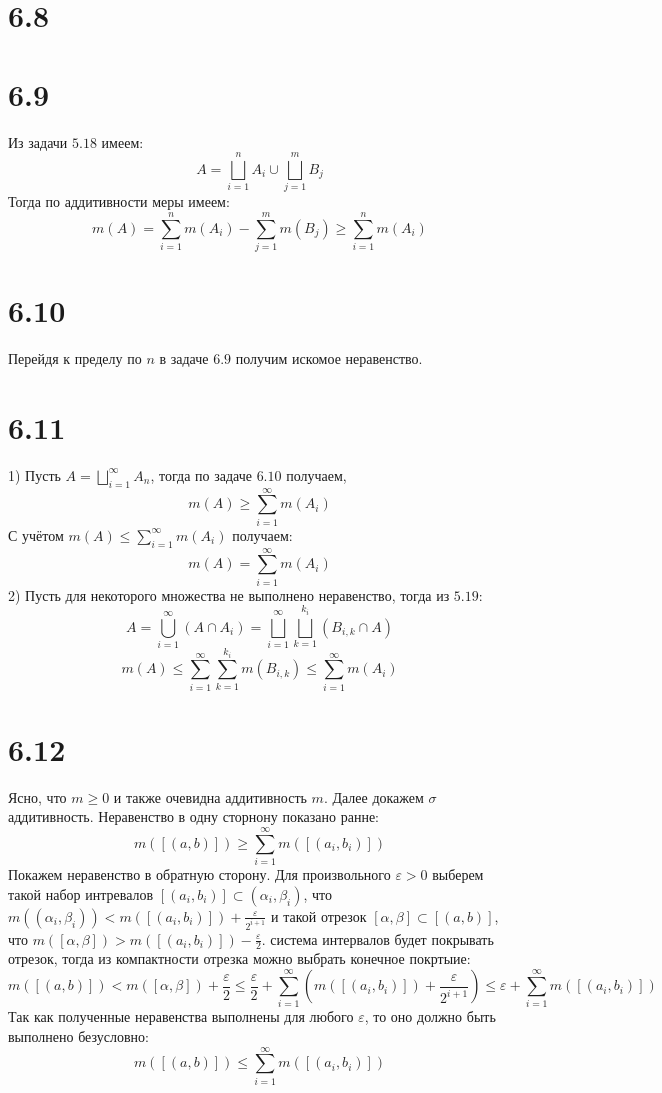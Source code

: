 \documentclass[12pt]{article}
\begin{document}
\section{6.8}
\section{6.9}
Из задачи $5.18$ имеем:
\[
    A = \bigsqcup_{i=1}^{n} A_i \cup \bigsqcup_{j=1}^{m} B_j
\]
Тогда по аддитивности меры имеем:
\[
    m(A) = \sum_{i=1}^{n} m(A_i) - \sum_{j=1}^{m} m(B_j) \geq \sum_{i=1}^{n} m(A_i)
\]
\section{6.10}
Перейдя к пределу по $n$ в задаче $6.9$ получим искомое неравенство.
\section{6.11}
1) Пусть $A = \bigsqcup_{i=1}^{\infty} A_n$, тогда по задаче $6.10$ получаем,
\[
    m(A) \geq \sum_{i=1}^{\infty} m(A_i)
\]
С учётом $m(A) \leq \sum_{i=1}^{\infty} m(A_i)$ получаем:
\[
    m(A) = \sum_{i=1}^{\infty} m(A_i)
\]
2) Пусть для некоторого множества не выполнено неравенство, тогда из $5.19$:
\[
    A = \bigcup_{i=1}^{\infty} (A \cap A_i) = \bigsqcup_{i=1}^{\infty} \bigsqcup_{k=1}^{k_i} (B_{i, k} \cap A)
\]
\[
    m(A) \leq \sum_{i=1}^{\infty} \sum_{k=1}^{k_i} m(B_{i, k}) \leq \sum_{i=1}^{\infty} m(A_i)
\]
\section{6.12}
Ясно, что $m \geq 0$ и также очевидна аддитивность $m$. Далее докажем $\sigma$ аддитивность. 
Неравенство в одну сторнону показано ранне: 
\[
    m([(a, b)]) \geq \sum_{i=1}^{\infty} m([(a_i, b_i)])
\]
Покажем неравенство в обратную сторону. Для произвольного $\varepsilon > 0$ 
выберем такой набор интревалов $[(a_i, b_i)] \subset (\alpha_i, \beta_i)$, что 
$m((\alpha_i, \beta_i)) < m([(a_i, b_i)]) + \frac{\varepsilon}{2^{i+1}}$ и такой отрезок $[\alpha, \beta] \subset [(a, b)]$, что 
$m([\alpha, \beta]) > m([(a_i, b_i)]) - \frac{\varepsilon}{2}$. система интервалов будет покрывать 
отрезок, тогда из компактности отрезка можно выбрать конечное покртыие: 
\[
    m([(a, b)]) < m([\alpha, \beta])  +\frac{\varepsilon}{2} \leq 
    \frac{\varepsilon}{2} + \sum_{i=1}^{\infty} \left( m([(a_i, b_i)]) + \frac{\varepsilon}{2^{i+1}} \right) \leq \varepsilon + 
    \sum_{i=1}^{\infty} m([(a_i, b_i)])
\]     
Так как полученные неравенства выполнены для любого $\varepsilon$, то оно должно быть выполнено безусловно: 
\[
    m([(a, b)]) \leq \sum_{i=1}^{\infty} m([(a_i, b_i)])
\] 
\end{document}

